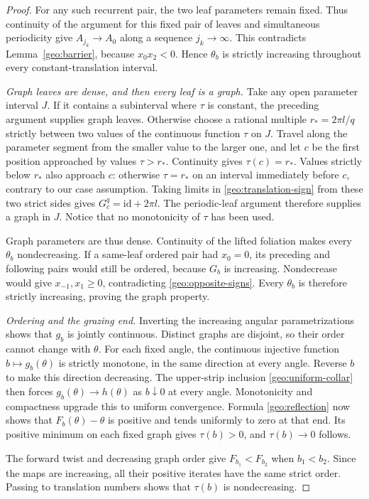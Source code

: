 \begin{proof}
For any such recurrent pair, the two leaf parameters remain fixed.
Thus continuity of the argument for this fixed pair of leaves and
simultaneous periodicity give $A_{j_k}\to A_0$ along a sequence
$j_k\to\infty$.  This contradicts Lemma~\ref{geo:barrier}, because
$x_0x_2<0$.  Hence $\theta_b$ is strictly increasing throughout every
constant-translation interval.

\emph{Graph leaves are dense, and then every leaf is a graph.}
Take any open parameter interval $J$.  If it contains a subinterval
where $\tau$ is constant, the preceding argument supplies graph leaves.
Otherwise choose a rational multiple $r_*=2\pi l/q$ strictly between
two values of the continuous function $\tau$ on $J$.  Travel along
the parameter segment from the smaller value to the larger one, and
let $c$ be the first position approached by values $\tau>r_*$.
Continuity gives $\tau(c)=r_*$.  Values strictly below $r_*$ also
approach $c$: otherwise $\tau=r_*$ on an interval immediately before
$c$, contrary to our case assumption.  Taking limits in
\eqref{geo:translation-sign} from these two strict sides gives
$G_c^q=\mathrm{id}+2\pi l$.  The periodic-leaf argument therefore
supplies a graph in $J$.  Notice that no monotonicity of $\tau$ has
been used.

Graph parameters are thus dense.  Continuity of the lifted foliation
makes every $\theta_b$ nondecreasing.  If a same-leaf ordered pair had
$x_0=0$, its preceding and following pairs would still be ordered,
because $G_b$ is increasing.  Nondecrease would give
$x_{-1},x_1\ge0$, contradicting \eqref{geo:opposite-signs}.
Every $\theta_b$ is therefore strictly increasing, proving the graph
property.

\emph{Ordering and the grazing end.}
Inverting the increasing angular parametrizations shows that $g_b$ is
jointly continuous.  Distinct graphs are disjoint, so their order cannot
change with $\theta$.  For each fixed angle, the continuous injective
function $b\mapsto g_b(\theta)$ is strictly monotone, in the same
direction at every angle.  Reverse $b$ to make this direction
decreasing.  The upper-strip inclusion \eqref{geo:uniform-collar}
then forces $g_b(\theta)\to h(\theta)$ as $b\downarrow0$ at every
angle.  Monotonicity and compactness upgrade this to uniform convergence.
Formula \eqref{geo:reflection} now shows that $F_b(\theta)-\theta$ is
positive and tends uniformly to zero at that end.  Its positive minimum
on each fixed graph gives $\tau(b)>0$, and $\tau(b)\to0$ follows.

The forward twist and decreasing graph order give $F_{b_1}<F_{b_2}$
when $b_1<b_2$.  Since the maps are increasing, all their positive
iterates have the same strict order.  Passing to translation numbers
shows that $\tau(b)$ is nondecreasing.


\end{proof}
